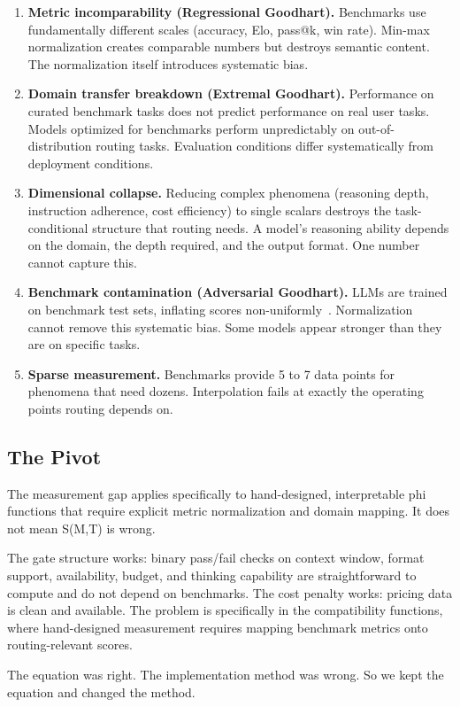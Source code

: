\begin{enumerate}
\item \textbf{Metric incomparability (Regressional Goodhart).} Benchmarks use fundamentally different scales (accuracy, Elo, pass@k, win rate). Min-max normalization creates comparable numbers but destroys semantic content. The normalization itself introduces systematic bias.

\item \textbf{Domain transfer breakdown (Extremal Goodhart).} Performance on curated benchmark tasks does not predict performance on real user tasks. Models optimized for benchmarks perform unpredictably on out-of-distribution routing tasks. Evaluation conditions differ systematically from deployment conditions.

\item \textbf{Dimensional collapse.} Reducing complex phenomena (reasoning depth, instruction adherence, cost efficiency) to single scalars destroys the task-conditional structure that routing needs. A model's reasoning ability depends on the domain, the depth required, and the output format. One number cannot capture this.

\item \textbf{Benchmark contamination (Adversarial Goodhart).} LLMs are trained on benchmark test sets, inflating scores non-uniformly~\citep{deng2023leaderboards}. Normalization cannot remove this systematic bias. Some models appear stronger than they are on specific tasks.

\item \textbf{Sparse measurement.} Benchmarks provide 5 to 7 data points for phenomena that need dozens. Interpolation fails at exactly the operating points routing depends on.
\end{enumerate}

\subsection{The Pivot}

The measurement gap applies specifically to hand-designed, interpretable phi functions that require explicit metric normalization and domain mapping. It does not mean S(M,T) is wrong.

The gate structure works: binary pass/fail checks on context window, format support, availability, budget, and thinking capability are straightforward to compute and do not depend on benchmarks. The cost penalty works: pricing data is clean and available. The problem is specifically in the compatibility functions, where hand-designed measurement requires mapping benchmark metrics onto routing-relevant scores.

The equation was right. The implementation method was wrong. So we kept the equation and changed the method.
